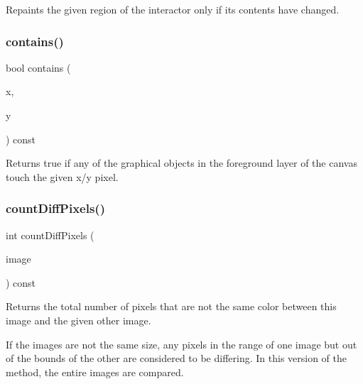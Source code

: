 Repaints the given region of the interactor only if its contents have changed. 

\mbox{\label{classGCanvas_abb6a5d7c03e6eaaae97264c4799ce7c3}} 
\subsubsection{\texorpdfstring{contains()}{contains()}}
{\footnotesize\ttfamily bool contains (\begin{DoxyParamCaption}\item[{double}]{x,  }\item[{double}]{y }\end{DoxyParamCaption}) const\hspace{0.3cm}{\ttfamily [virtual]}}



Returns true if any of the graphical objects in the foreground layer of the canvas touch the given x/y pixel. 

\mbox{\label{classGCanvas_ad3d6147a5e08ed97bb71c7f267ef071b}} 
\subsubsection{\texorpdfstring{count\+Diff\+Pixels()}{countDiffPixels()}\hspace{0.1cm}{\footnotesize\ttfamily [1/4]}}
{\footnotesize\ttfamily int count\+Diff\+Pixels (\begin{DoxyParamCaption}\item[{const \mbox{\hyperlink{classGCanvas}{G\+Canvas}} \&}]{image }\end{DoxyParamCaption}) const\hspace{0.3cm}{\ttfamily [virtual]}}



Returns the total number of pixels that are not the same color between this image and the given other image. 

If the images are not the same size, any pixels in the range of one image but out of the bounds of the other are considered to be differing. In this version of the method, the entire images are compared. \mbox{\label{classGCanvas_a3ed6edef8ed522bbfc09d8f6005d6d8e}} 
